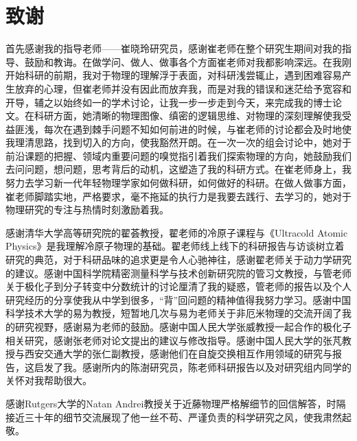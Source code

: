 \chapter[致谢]{致\quad 谢}%

首先感谢我的指导老师——崔晓玲研究员，感谢崔老师在整个研究生期间对我的指导、鼓励和教诲。在做学问、做人、做事各个方面崔老师对我都影响深远。在我刚开始科研的前期，我对于物理的理解浮于表面，对科研浅尝辄止，遇到困难容易产生放弃的心理，但崔老师并没有因此而放弃我，而是对我的错误和迷茫给予宽容和开导，辅之以始终如一的学术讨论，让我一步一步走到今天，来完成我的博士论文。在科研方面，她清晰的物理图像、缜密的逻辑思维、对物理的深刻理解使我受益匪浅，每次在遇到棘手问题不知如何前进的时候，与崔老师的讨论都会及时地使我理清思路，找到切入的方向，使我豁然开朗。在一次一次的组会讨论中，她对于前沿课题的把握、领域内重要问题的嗅觉指引着我们探索物理的方向，她鼓励我们去问问题，想问题，思考背后的动机，这塑造了我的科研方式。在崔老师身上，我努力去学习新一代年轻物理学家如何做科研，如何做好的科研。在做人做事方面，崔老师脚踏实地，严格要求，毫不拖延的执行力是我要去践行、去学习的，她对于物理研究的专注与热情时刻激励着我。

感谢清华大学高等研究院的翟荟教授，翟老师的冷原子课程与《Ultracold Atomic Physics》是我理解冷原子物理的基础。翟老师线上线下的科研报告与访谈树立着研究的典范，对于科研品味的追求更是令人心驰神往，感谢翟老师关于动力学研究的建议。感谢中国科学院精密测量科学与技术创新研究院的管习文教授，与管老师关于极化子到分子转变中分数统计的讨论厘清了我的疑惑，管老师的报告以及个人研究经历的分享使我从中学到很多，“背”回问题的精神值得我努力学习。感谢中国科学技术大学的易为教授，短暂地几次与易为老师关于非厄米物理的交流开阔了我的研究视野，感谢易为老师的鼓励。感谢中国人民大学张威教授一起合作的极化子相关研究，感谢张老师对论文提出的建议与修改指导。感谢中国人民大学的张芃教授与西安交通大学的张仁副教授，感谢他们在自旋交换相互作用领域的研究与报告，这启发了我。感谢所内的陈澍研究员，陈老师科研报告以及对研究组内同学的关怀对我帮助很大。

感谢Rutgers大学的Natan Andrei教授关于近藤物理严格解细节的回信解答，时隔接近三十年的细节交流展现了他一丝不苟、严谨负责的科学研究之风，使我肃然起敬。

